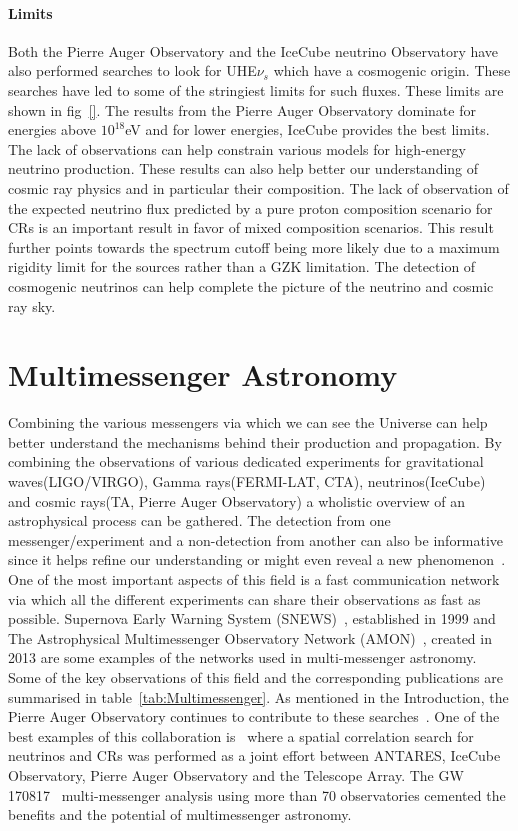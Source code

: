   \paragraph{Limits}
    \label{subsubsec:CosmoNuLimits}
  Both the Pierre Auger Observatory and the IceCube neutrino Observatory have also performed searches to look for UHE$\nu_s$ which have a cosmogenic origin. These searches have led to some of the stringiest limits for such fluxes. These limits are shown in fig~\ref{}. The results from the Pierre Auger Observatory dominate for energies above $10^{18}$eV and for lower energies, IceCube provides the best limits. The lack of observations can help constrain various models for high-energy neutrino production. These results can also help better our understanding of cosmic ray physics and in particular their composition. The lack of observation of the expected neutrino flux predicted by a pure proton composition scenario for CRs is an important result in favor of mixed composition scenarios. This result further points towards the spectrum cutoff being more likely due to a maximum rigidity limit for the sources rather than a GZK limitation. The detection of cosmogenic neutrinos can help complete the picture of the neutrino and cosmic ray sky. 

\section{Multimessenger Astronomy}
  \label{sec:Mul-mes}
Combining the various messengers via which we can see the Universe can help better understand the mechanisms behind their production and propagation. By combining the observations of various dedicated experiments for gravitational waves(LIGO/VIRGO), Gamma rays(FERMI-LAT, CTA), neutrinos(IceCube) and cosmic rays(TA, Pierre Auger Observatory) a wholistic overview of an astrophysical process can be gathered. The detection from one messenger/experiment and a non-detection from another can also be informative since it helps refine our understanding or might even reveal a new phenomenon~\cite{Abadie_2012,Albert_2017_GW170817}. One of the most important aspects of this field is a fast communication network via which all the different experiments can share their observations as fast as possible. Supernova Early Warning System (SNEWS)~\cite{Al_Kharusi_2021}, established in 1999 and The Astrophysical Multimessenger Observatory Network (AMON)~\cite{Smith_2013}, created in 2013 are some examples of the networks used in multi-messenger astronomy.  Some of the key observations of this field and the corresponding publications are summarised in table~\ref{tab:Multimessenger}. As mentioned in the Introduction, the Pierre Auger Observatory continues to contribute to these searches~\cite{10.3389/fspas.2019.00024}. One of the best examples of this collaboration is~\cite{2022_spatial_corr_nu_cr} where a spatial correlation search for neutrinos and CRs was performed as a joint effort between ANTARES, IceCube Observatory, Pierre Auger Observatory and the Telescope Array. The GW 170817~\cite{Abbott_2017} multi-messenger analysis using more than 70 observatories cemented the benefits and the potential of multimessenger astronomy. 

